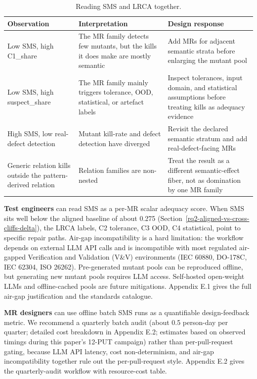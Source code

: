 \documentclass[12pt]{article}
\begin{document}
{\def\LTcaptype{table} %
\begin{longtable}[]{@{}
  >{\raggedright\arraybackslash}p{}
  >{\raggedright\arraybackslash}p{}
  >{\raggedright\arraybackslash}p{}@{}}
\caption{Reading SMS and LRCA together.}\label{tab:sms-lrca-reading}\\
\toprule\noalign{}
Observation & Interpretation & Design response \\
\midrule\noalign{}
\endfirsthead
\endhead
\bottomrule\noalign{}
\endlastfoot
Low SMS, high C1\_share & The MR family detects few mutants, but the
kills it does make are mostly semantic & Add MRs for adjacent semantic
strata before enlarging the mutant pool \\
Low SMS, high suspect\_share & The MR family mainly triggers tolerance,
OOD, statistical, or artefact labels & Inspect tolerances, input domain,
and statistical assumptions before treating kills as adequacy evidence \\
High SMS, low real-defect detection & Mutant kill-rate and defect
detection have diverged & Revisit the declared semantic stratum and add
real-defect-facing MRs \\
Generic relation kills outside the pattern-derived relation & Relation
families are non-nested & Treat the result as a different
semantic-effect fiber, not as domination by one MR family \\
\end{longtable}
}

\textbf{Test engineers} can read SMS as a per-MR scalar adequacy score.
When SMS sits well below the aligned baseline of about 0.275 (Section~\ref{rq2-aligned-vs-cross-cliffs-delta}), the
LRCA labels, C2 tolerance, C3 OOD, C4 statistical, point to specific
repair paths. Air-gap incompatibility is a hard limitation: the workflow
depends on external LLM API calls and is incompatible with most
regulated air-gapped Verification and Validation (V\&V) environments
(IEC 60880, DO-178C, IEC 62304, ISO 26262). Pre-generated mutant pools
can be reproduced offline, but generating new mutant pools requires LLM
access. Self-hosted open-weight LLMs and offline-cached pools are future
mitigations. Appendix E.1 gives the full air-gap justification and the
standards catalogue.

\textbf{MR designers} can use offline batch SMS runs as a quantifiable
design-feedback metric. We recommend a quarterly batch audit (about 0.5
person-day per quarter; detailed cost breakdown in Appendix E.2;
estimates based on observed timings during this paper's 12-PUT campaign)
rather than per-pull-request gating, because LLM API latency, cost
non-determinism, and air-gap incompatibility together rule out the
per-pull-request style. Appendix E.2 gives the quarterly-audit workflow
with resource-cost table.
\end{document}
